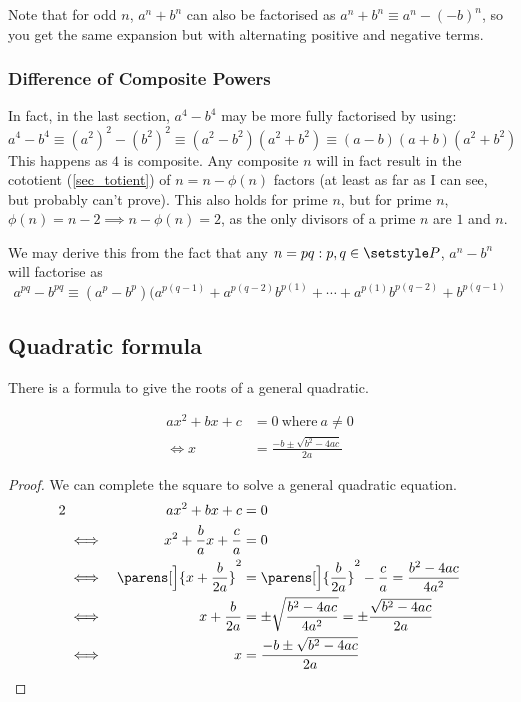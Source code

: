 Note that for odd \(n\), \(a^n + b^n\) can also be factorised as
\(a^n + b^n \equiv a^n - (-b)^n\), so you get the same expansion but with
alternating positive and negative terms.


\subsubsection{Difference of Composite Powers}

In fact, in the last section, \(a^4 - b^4\) may be more fully factorised by
using:
\begin{equation*}
    a^4 - b^4 \equiv (a^2)^2 - (b^2)^2 \equiv (a^2 - b^2)(a^2 + b^2) \equiv
        (a - b)(a + b)(a^2 + b^2)
\end{equation*}
This happens as \(4\) is composite. Any composite \(n\) will in fact result
in the cototient (\ref{sec_totient}) of \(n = n - \phi(n)\) factors (at
least as far as I can see, but probably can't prove). This
also holds for prime \(n\), but for prime \(n\),
\(\phi(n) = n - 2 \implies n - \phi(n) = 2\), as the only divisors of
a prime \(n\) are \(1\) and \(n\).

We may derive this from the fact that any \(n = pq: p, q \in \setstyle P\),
\(a^n - b^n\) will factorise as
\begin{equation}
    a^{pq} - b^{pq} \equiv
        (a^p - b^p)(a^{p(q - 1)} + a^{p(q - 2)}b^{p(1)} + \dotsb +
                    a^{p(1)}b^{p(q - 2)} + b^{p(q - 1)}
\end{equation}

\subsection{Quadratic formula} \label{sec_quad_formula}

There is a formula to give the roots of a general quadratic.
\begin{theorem}
\begin{align*}
ax^2 + bx + c &= 0\ \text{where}\ a \neq 0 \\
\iff x &= \frac{-b \pm \sqrt{b^2 - 4ac}}{2a}
\end{align*}
\end{theorem}
\begin{proof}
We can complete the square to solve a general quadratic equation.
\begin{alignat*}2
&&ax^2 + bx + c &= 0 \\
&\iff& x^2 + \frac ba x + \frac ca &= 0 \\
    &\iff& \parens[\Big]{x + \frac b{2a}}^2
        &= \parens[\Big]{\frac b{2a}}^2 - \frac ca
        = \frac{b^2 - 4ac}{4a^2} \\
&\iff& x + \frac b{2a} &= \pm \sqrt{\frac{b^2 - 4ac}{4a^2}}
    = \pm \frac{\sqrt{b^2 - 4ac}}{2a} \\
&\iff& x &= \frac{-b \pm \sqrt{b^2 - 4ac}}{2a} \qedhere
\end{alignat*}
\end{proof}


